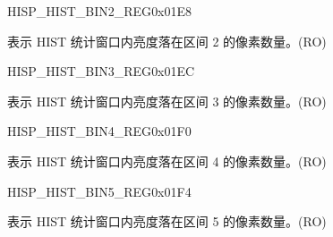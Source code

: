 \begin{register}{H}{ISP\_HIST\_BIN2\_REG}{0x01E8}\label{regdesc:ISPHISTBIN2REG}
%
%
\regnewline%
\begin{regdesc}\begin{reglist}
\label{fielddesc:ISPHISTBIN2}\item [ISP\_HIST\_BIN\_2] 表示 HIST 统计窗口内亮度落在区间 2 的像素数量。(RO)
\end{reglist}\end{regdesc}
\end{register}


\begin{register}{H}{ISP\_HIST\_BIN3\_REG}{0x01EC}\label{regdesc:ISPHISTBIN3REG}
%
%
\regnewline%
\begin{regdesc}\begin{reglist}
\label{fielddesc:ISPHISTBIN3}\item [ISP\_HIST\_BIN\_3] 表示 HIST 统计窗口内亮度落在区间 3 的像素数量。(RO)
\end{reglist}\end{regdesc}
\end{register}


\begin{register}{H}{ISP\_HIST\_BIN4\_REG}{0x01F0}\label{regdesc:ISPHISTBIN4REG}
%
%
\regnewline%
\begin{regdesc}\begin{reglist}
\label{fielddesc:ISPHISTBIN4}\item [ISP\_HIST\_BIN\_4] 表示 HIST 统计窗口内亮度落在区间 4 的像素数量。(RO)
\end{reglist}\end{regdesc}
\end{register}


\begin{register}{H}{ISP\_HIST\_BIN5\_REG}{0x01F4}\label{regdesc:ISPHISTBIN5REG}
%
%
\regnewline%
\begin{regdesc}\begin{reglist}
\label{fielddesc:ISPHISTBIN5}\item [ISP\_HIST\_BIN\_5] 表示 HIST 统计窗口内亮度落在区间 5 的像素数量。(RO)
\end{reglist}\end{regdesc}
\end{register}


